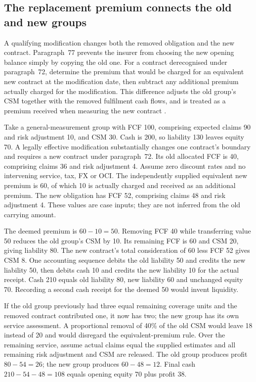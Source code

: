 \subsection{The replacement premium connects the old and new groups}
\label{sec:insurance-modification-values}

A qualifying modification changes both the removed obligation and the new
contract. Paragraph~77 prevents the insurer from choosing the new opening
balance simply by copying the old one. For a contract derecognised under
paragraph~72, determine the premium that would be charged for an equivalent
new contract at the modification date, then subtract any additional premium
actually charged for the modification. This difference adjusts the old
group's CSM together with the removed fulfilment cash flows, and is treated
as a premium received when measuring the new contract
\citep[IFRS~17.72--77]{eu20231803}.

Take a general-measurement group with FCF 100, comprising expected claims
90 and risk adjustment 10, and CSM 30. Cash is 200, so liability 130 leaves
equity 70. A legally effective modification substantially changes one
contract's boundary and requires a new contract under paragraph~72. Its old
allocated FCF is 40, comprising claims 36 and risk adjustment 4. Assume zero
discount rates and no intervening service, tax, FX or OCI. The independently
supplied equivalent new premium is 60, of which 10 is actually charged and
received as an additional premium. The new obligation has FCF 52, comprising
claims 48 and risk adjustment 4. These values are case inputs; they are not
inferred from the old carrying amount.

The deemed premium is \(60-10=50\). Removing FCF 40 while transferring
value 50 reduces the old group's CSM by 10. Its remaining FCF is 60 and
CSM 20, giving liability 80. The new contract's total consideration of 60
less FCF 52 gives CSM 8. One accounting sequence debits the old liability
50 and credits the new liability 50, then debits cash 10 and credits the
new liability 10 for the actual receipt. Cash 210 equals old liability 80,
new liability 60 and unchanged equity 70. Recording a second cash receipt
for the deemed 50 would invent liquidity.

If the old group previously had three equal remaining coverage units and
the removed contract contributed one, it now has two; the new group has its
own service assessment. A proportional removal of 40\% of the old CSM
would leave 18 instead of 20 and would disregard the equivalent-premium
rule. Over the remaining service, assume actual claims equal the supplied
estimates and all remaining risk adjustment and CSM are released. The old
group produces profit \(80-54=26\); the new group produces
\(60-48=12\). Final cash \(210-54-48=108\) equals opening equity 70
plus profit 38.

